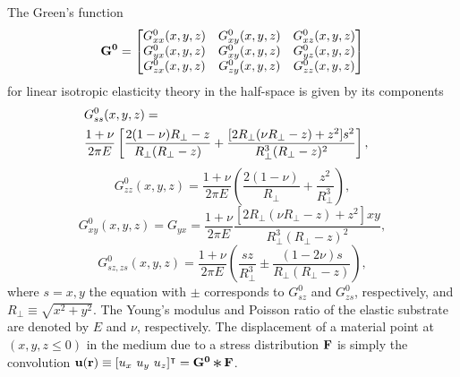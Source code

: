 \documentclass[aps,prl,reprint,twocolumn,groupedaddress,showpacs]{revtex4-1}
\def\r{{\bf r}}
\def\u{{\bf u}}
\def\F{{\bf F}}
\def\F{{\bf F}}
\newcommand{\Conv}{\mathop{\scalebox{1.5}{\raisebox{-0.2ex}{$\ast$}}}}%
\begin{document}
The Green's function 
\begin{equation}
{\bf G^0} = \left[ \begin{matrix} G^0_{xx}(x,y,z) & G^0_{xy}(x,y,z) & G^0_{xz}(x,y,z) \\
	G^0_{yx}(x,y,z) & G^0_{xy}(x,y,z) & G^0_{yz}(x,y,z) \\
	G^0_{zx}(x,y,z) & G^0_{zy}(x,y,z) & G^0_{zz}(x,y,z) 
 \end{matrix} \right]
\end{equation}
for linear isotropic elasticity theory 
in the half-space is given by its components
%
\begin{align}
\lefteqn{G^0_{ss}(x,y,z) = }\nonumber\\
&\frac{1+\nu}{2\pi E}\left[\frac{2(1-\nu)R_{\perp}-z}{R_{\perp}(R_{\perp}-z)} + 
\frac{[2R_{\perp}(\nu R_{\perp}-z)+z^{2}]s^{2}}{R_{\perp}^{3}(R_{\perp}-z)^{2}}\right],
\end{align}
\begin{equation}
G^0_{zz}(x,y,z) =\frac{1+\nu}{2\pi E}\left(\frac{2(1-\nu)}{R_{\perp}}+\frac{z^{2}}{R_{\perp}^{3}}\right),
\label{eq:Gzz0}
\end{equation}
\begin{equation} 
G^0_{xy}(x,y,z) = G_{yx}=\frac{1+\nu}{2\pi E}\frac{[2R_{\perp}(\nu R_{\perp}-z)+z^{2}]xy}{R_{\perp}^{3}
(R_{\perp}-z)^{2}},
\label{eq:Gxy0}
\end{equation}
\begin{equation}
G^0_{sz, zs}(x,y,z) =\frac{1+\nu}{2\pi E}\left(\frac{sz}{R_{\perp}^{3}}\pm\frac{(1-2\nu)s}{R_{\perp}
(R_{\perp}-z)}\right),
\end{equation}
%
where $s=x,y$  the equation with $\pm$ corresponds to $G^0_{sz}$ and $G^0_{zs}$, respectively, 
and $R_{\perp} \equiv \sqrt{x^{2} +y^{2}}$. The Young's modulus and Poisson ratio of the elastic substrate are denoted by 
$E$ and $\nu$, respectively.   
The displacement of a material point at $(x,y,z\leq 0)$ in the medium due
to a stress distribution ${\bf F}$ is simply the convolution
$\u(\r) \equiv [u_x \ u_y\  u_z]^\intercal = {\bf G^0}\Conv\F$.



\end{document}
